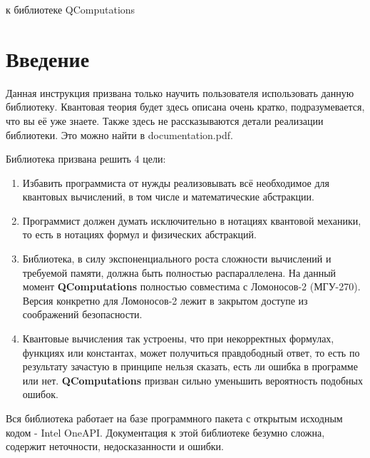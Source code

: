 \documentclass[12pt,fleqn]{article}
\begin{document}
    \begin{titlepage}
        \begin{center}
            \textsf{\Large{} к библиотеке QComputations}\\[15mm]
        \end{center}
    \end{titlepage}

    \newpage

    \setcounter{page}{2}
	\thispagestyle{empty}
	\tableofcontents

    \newpage

    \section{Введение}
        Данная инструкция призвана только научить пользователя использовать данную библиотеку. Квантовая теория будет здесь описана очень кратко, подразумевается, что вы её уже знаете. 
        Также здесь не рассказываются детали реализации библиотеки. Это можно найти в \textsf{documentation.pdf}.

        Библиотека призвана решить 4 цели:
        \begin{enumerate}
            \item{Избавить программиста от нужды реализовывать всё необходимое для квантовых вычислений, в том числе и математические абстракции.}
            \item{Программист должен думать исключительно в нотациях квантовой механики, то есть в нотациях формул и физических абстракций.}
            \item{Библиотека, в силу экспоненциального роста сложности вычислений и требуемой памяти, должна быть полностью распараллелена. 
            На данный момент \textbf{QComputations} полностью совместима с Ломоносов-2 (МГУ-270).
             Версия конкретно для Ломоносов-2 лежит в закрытом доступе из соображений безопасности.}
            \item{Квантовые вычисления так устроены, что при некорректных формулах, функциях или константах, может получиться правдободный ответ, то есть по результату зачастую в принципе 
            нельзя сказать, есть ли ошибка в программе или нет. \textbf{QComputations} призван сильно уменьшить вероятность подобных ошибок.}
        \end{enumerate}

        Вся библиотека работает на базе программного пакета с открытым исходным кодом - \textsf{Intel OneAPI}. 
        Документация к этой библиотеке безумно сложна, содержит неточности, недосказанности и ошибки. 
        
\end{document}
